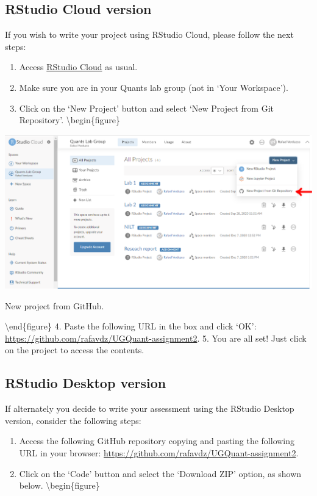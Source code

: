 \documentclass[
]{book}
\providecommand{\tightlist}{%
  \setlength{\itemsep}{0pt}\setlength{\parskip}{0pt}}
\begin{document}
\hypertarget{rstudio-cloud-version}{%
\subsection{RStudio Cloud version}\label{rstudio-cloud-version}}

If you wish to write your project using RStudio Cloud, please follow the next steps:

\begin{enumerate}
\def\labelenumi{\arabic{enumi}.}
\tightlist
\item
  Access \href{https://rstudio.cloud/}{RStudio Cloud} as usual.
\item
  Make sure you are in your Quants lab group (not in `Your Workspace').
\item
  Click on the `New Project' button and select `New Project from Git Repository'.
  \textbackslash begin\{figure\}
\end{enumerate}

\includegraphics[width=1\linewidth]{./images/research_rep_2} \hfill{}

\caption{New project from GitHub.}

\label{fig:unnamed-chunk-114}
\textbackslash end\{figure\}
4. Paste the following URL in the box and click `OK': \url{https://github.com/rafavdz/UGQuant-assignment2}.
5. You are all set! Just click on the project to access the contents.

\hypertarget{rstudio-desktop-version}{%
\subsection{RStudio Desktop version}\label{rstudio-desktop-version}}

If alternately you decide to write your assessment using the RStudio Desktop version, consider the following steps:

\begin{enumerate}
\def\labelenumi{\arabic{enumi}.}
\tightlist
\item
  Access the following GitHub repository copying and pasting the following URL in your browser: \url{https://github.com/rafavdz/UGQuant-assignment2}.
\item
  Click on the `Code' button and select the `Download ZIP' option, as shown below.
  \textbackslash begin\{figure\}
\end{enumerate}
\end{document}

